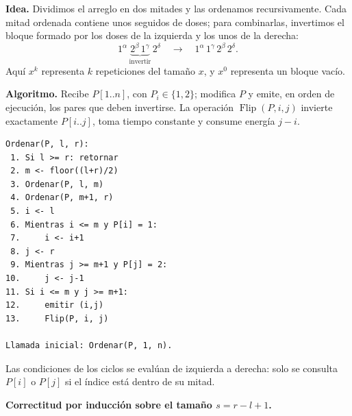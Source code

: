 
\textbf{Idea.} Dividimos el arreglo en dos mitades y las ordenamos recursivamente. Cada mitad ordenada contiene unos seguidos de doses; para combinarlas, invertimos el bloque formado por los doses de la izquierda y los unos de la derecha:
\[
1^\alpha\,\underbrace{2^\beta\,1^\gamma}_{\text{invertir}}\,2^\delta
\quad\longrightarrow\quad
1^\alpha\,1^\gamma\,2^\beta\,2^\delta.
\]
Aquí $x^k$ representa $k$ repeticiones del tamaño $x$, y $x^0$ representa un bloque vacío.

\textbf{Algoritmo.} Recibe $P[1..n]$, con $P_i\in\{1,2\}$; modifica $P$ y emite, en orden de ejecución, los pares que deben invertirse. La operación $\operatorname{Flip}(P,i,j)$ invierte exactamente $P[i..j]$, toma tiempo constante y consume energía $j-i$.

\begin{verbatim}
Ordenar(P, l, r):
 1. Si l >= r: retornar
 2. m <- floor((l+r)/2)
 3. Ordenar(P, l, m)
 4. Ordenar(P, m+1, r)
 5. i <- l
 6. Mientras i <= m y P[i] = 1:
 7.     i <- i+1
 8. j <- r
 9. Mientras j >= m+1 y P[j] = 2:
10.     j <- j-1
11. Si i <= m y j >= m+1:
12.     emitir (i,j)
13.     Flip(P, i, j)

Llamada inicial: Ordenar(P, 1, n).
\end{verbatim}

Las condiciones de los ciclos se evalúan de izquierda a derecha: solo se consulta $P[i]$ o $P[j]$ si el índice está dentro de su mitad.

\textbf{Correctitud por inducción sobre el tamaño $s=r-l+1$.}

